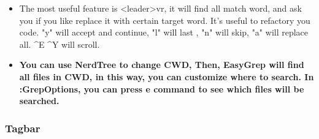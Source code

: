 \documentclass[a4paper,12pt,twoside]{book}
\begin{document}
\begin{itemize}
		\item The most useful feature is <leader>vr, it will find all match word, and ask you if you like replace it with certain target word. It's useful to refactory you code. "y" will accept and continue, "l" will last , "n" will skip, "a" will replace all. \^{}E \^{}Y will scroll.

		\item \textbf{You can use NerdTree to change CWD, Then, EasyGrep will find all files in CWD, in this way, you can customize where to search. In :GrepOptions, you can press e command to see which files will be searched.}
\end{itemize}

\subsubsection{Tagbar}
\end{document}
